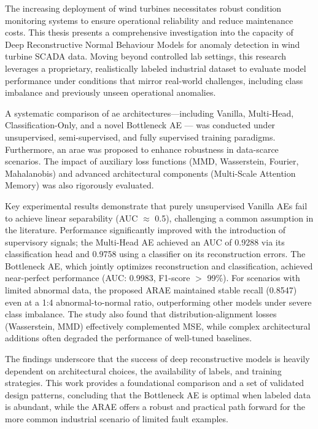 \begin{abstracts}  


    The increasing deployment of wind turbines necessitates robust condition monitoring systems to ensure operational reliability and reduce maintenance costs.
    This thesis presents a comprehensive investigation into the capacity of Deep Reconstructive Normal Behaviour Models for anomaly detection in wind turbine SCADA data.
    Moving beyond controlled lab settings, this research leverages a proprietary, realistically labeled industrial dataset to evaluate model performance under conditions that mirror real-world challenges, including class imbalance and previously unseen operational anomalies.

    A systematic comparison of \gls{ae} architectures—including Vanilla, Multi-Head, Classification-Only, and a novel Bottleneck AE — was conducted under unsupervised, semi-supervised, and fully supervised training paradigms.
    Furthermore, an \gls{arae} was proposed to enhance robustness in data-scarce scenarios.
    The impact of auxiliary loss functions (MMD, Wasserstein, Fourier, Mahalanobis) and advanced architectural components (Multi-Scale Attention Memory) was also rigorously evaluated.

    Key experimental results demonstrate that purely unsupervised Vanilla AEs fail to achieve linear separability (AUC $\approx$ 0.5), challenging a common assumption in the literature.
    Performance significantly improved with the introduction of supervisory signals; the Multi-Head AE achieved an AUC of 0.9288 via its classification head and 0.9758 using a classifier on its reconstruction errors.
    The Bottleneck AE, which jointly optimizes reconstruction and classification, achieved near-perfect performance (AUC: 0.9983, F1-score $>$ 99\%).
    For scenarios with limited abnormal data, the proposed ARAE maintained stable recall (0.8547) even at a 1:4 abnormal-to-normal ratio, outperforming other models under severe class imbalance.
    The study also found that distribution-alignment losses (Wasserstein, MMD) effectively complemented MSE, while complex architectural additions often degraded the performance of well-tuned baselines.

    The findings underscore that the success of deep reconstructive models is heavily dependent on architectural choices, the availability of labels, and training strategies.
    This work provides a foundational comparison and a set of validated design patterns, concluding that the Bottleneck AE is optimal when labeled data is abundant, while the ARAE offers a robust and practical path forward for the more common industrial scenario of limited fault examples.

\end{abstracts}
